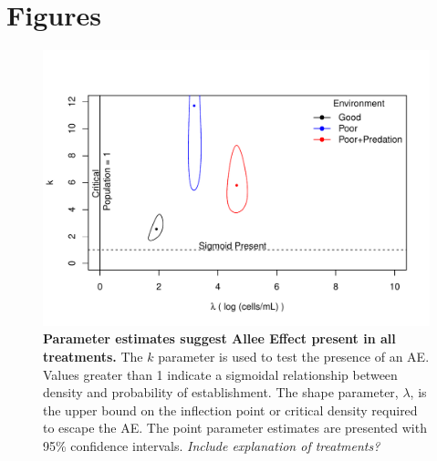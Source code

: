 \documentclass[a4paper,10pt]{article}
\begin{document}
\section{Figures}






\begin{figure}[!h]
\begin{center}
\includegraphics{MS_v1-fig1}
\end{center}
\caption{\textbf{Parameter estimates suggest Allee Effect present in all treatments.} The $k$ parameter is used to test the presence of an AE. Values greater than 1 indicate a sigmoidal relationship between density and probability of establishment. The shape parameter, $\lambda$, is the upper bound on the inflection point or critical density required to escape the AE. The point parameter estimates are presented with 95\% confidence intervals.  \textit{Include explanation of treatments?}
}
\end{figure}
\end{document}
